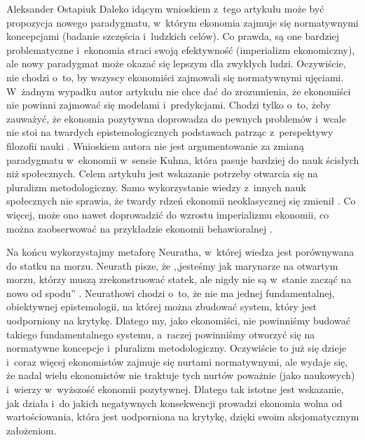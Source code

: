 \begin{artplenv}{Aleksander Ostapiuk}
Daleko idącym wnioskiem z~tego artykułu może być propozycja nowego paradygmatu, w~którym ekonomia zajmuje się
normatywnymi koncepcjami (badanie szczęścia i~ludzkich celów). Co prawda, są one bardziej
problematyczne i~ekonomia straci swoją efektywność (imperializm ekonomiczny), ale nowy paradygmat może okazać
się lepszym dla zwykłych
ludzi. Oczywiście, nie chodzi o~to, by wszyscy ekonomiści zajmowali się normatywnymi ujęciami. W~żadnym wypadku autor
artykułu nie chce dać do zrozumienia, że ekonomiści nie powinni zajmować się modelami i~predykcjami. Chodzi tylko o~to,
żeby zauważyć, że ekonomia pozytywna doprowadza do pewnych problemów i~wcale nie stoi na twardych epistemologicznych
podstawach patrząc z~perspektywy filozofii nauki
\parencite{kuhn_structure_1962,feyerabend_against_1975,lakatos_methodology_1980,caldwell_beyond_1982,mccloskey_rhetoric_1998,hands_reflection_2001}.
Wnioskiem autora nie jest argumentowanie za zmianą
paradygmatu w~ekonomii w~sensie Kuhna, która pasuje bardziej do nauk ścisłych niż społecznych.
Celem artykułu jest wskazanie potrzeby
otwarcia się na pluralizm metodologiczny. Samo wykorzystanie wiedzy z~innych nauk społecznych nie sprawia, że twardy
rdzeń ekonomii neoklasycznej się zmienił
\parencite[zob.][]{dow_foundations_2012}.
Co więcej, może ono nawet
doprowadzić do wzrostu imperializmu ekonomii, co można zaobserwować na przykładzie ekonomii behawioralnej
\parencite{berg_as-if_2010}.

Na końcu wykorzystajmy metaforę Neuratha, w~której wiedza jest porównywana do statku na morzu. Neurath pisze, że
,,jesteśmy jak marynarze na otwartym morzu, którzy muszą zrekonstruować statek, ale nigdy nie są w~stanie zacząć na nowo
od spodu''
\parencite[s.~199]{neurath_anti-spengler_1973}.
Neurathowi chodzi o~to, że nie ma jednej fundamentalnej,
obiektywnej epistemologii, na której można zbudować system, który jest uodporniony na krytykę. Dlatego my, jako
ekonomiści, nie powinniśmy budować takiego fundamentalnego systemu, a~raczej powinniśmy otworzyć się na normatywne
koncepcje i~pluralizm metodologiczny. Oczywiście to już się dzieje i~coraz więcej ekonomistów zajmuje się nurtami
normatywnymi, ale wydaje się, że nadal wielu ekonomistów nie traktuje tych nurtów poważnie
(jako naukowych) i~wierzy w~wyższość ekonomii pozytywnej.
Dlatego tak istotne jest wskazanie, jak działa i~do jakich negatywnych konsekwencji
prowadzi ekonomia wolna od wartościowania, która jest uodporniona na krytykę, dzięki swoim aksjomatycznym założeniom. 

\end{artplenv}\label{ost-stop}